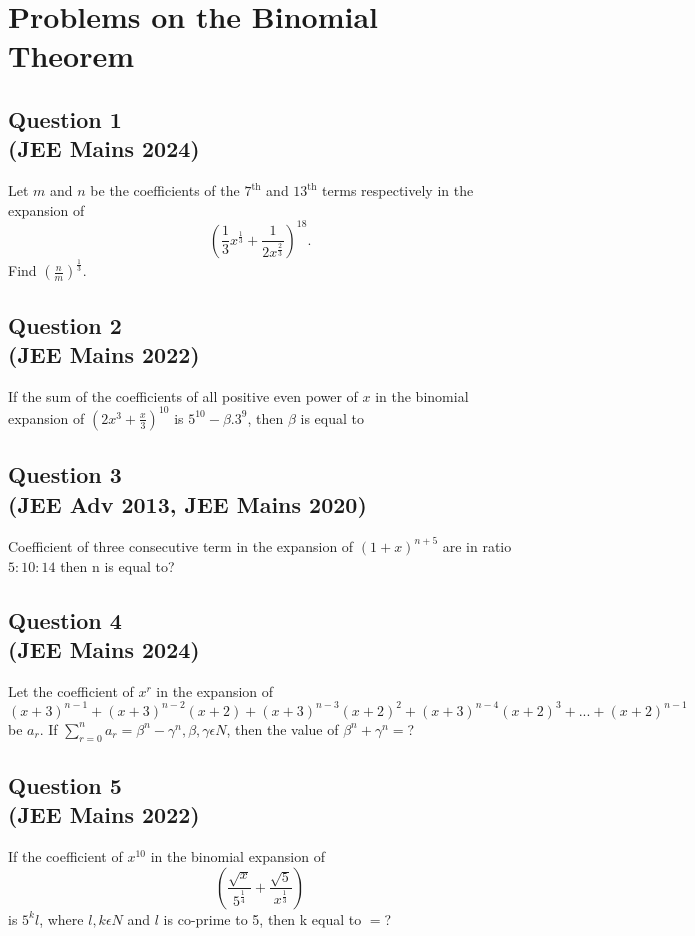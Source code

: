 \section{Problems on the Binomial Theorem}
\subsection*{Question 1 \\ \small (JEE Mains 2024)}

Let $m$ and $n$ be the coefficients of the $7^{\text{th}}$ and 
$13^{\text{th}}$ terms respectively in the expansion of 
\[
\left(\frac{1}{3}x^{\frac{1}{3}} + \frac{1}{2x^{\frac{2}{3}}}\right)^{18}.
\]
Find $\left(\frac{n}{m}\right)^{\frac{1}{3}}$.

\subsection*{Question 2 \\ \small(JEE Mains 2022)}

If the sum of the coefficients of all positive even power of $x$ in the binomial expansion of $(2x^3+ \frac{x}{3})^{10}$ is $5^{10} - \beta.3^9$, then $\beta$ is equal to

\subsection*{Question 3 \\ \small(JEE Adv 2013, JEE Mains 2020)}
Coefficient of three consecutive term in the expansion of $(1+x)^{n+5}$ are in ratio $5:10:14$ then n is equal to?

\subsection*{Question 4 \\ \small(JEE Mains 2024)}
Let the coefficient of $x^r$ in the expansion of \\
\[
(x+3)^{n-1}+(x+3)^{n-2}(x+2)+(x+3)^{n-3}(x+2)^2+(x+3)^{n-4}(x+2)^3+...+(x+2)^{n-1}
\]
be $a_r$. If $\sum_{r=0}^{n}a_r = \beta^n - \gamma^n, \beta,\gamma \epsilon N$, then the value of $\beta^n+\gamma^n = $? 
\newpage
\subsection*{Question 5 \\ \small(JEE Mains 2022)}
If the coefficient of $x^{10}$ in the binomial expansion of \[
({\frac{\sqrt{x}}{5^{\frac{1}{4}}}+{\frac{\sqrt{5}}{x^{\frac{1}{3}}}}})
\] is $5^kl$, where $l,k \epsilon N$ and $l$ is co-prime to 5, then k equal to $=$?

